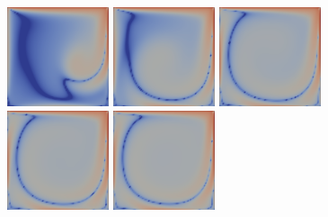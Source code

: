 \documentclass[english, nochinese]{pkupaper}
\begin{document}
\begin{figure}[htbp]
{{
\includegraphics[width=3cm]{Results/Figure02k.png}
\includegraphics[width=3cm]{Results/Figure02l.png}
\includegraphics[width=3cm]{Results/Figure02m.png}
\includegraphics[width=3cm]{Results/Figure02n.png}
\includegraphics[width=3cm]{Results/Figure02o.png}
}

}
\end{figure}
\end{document}
